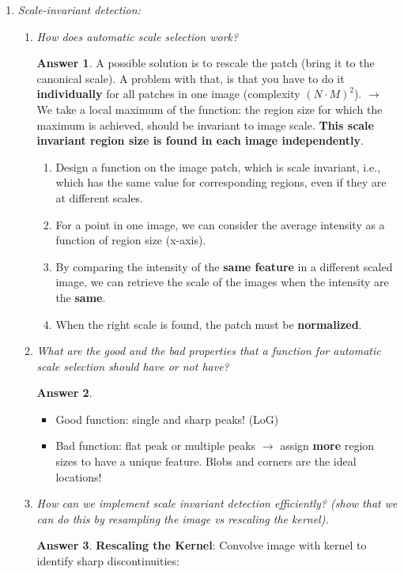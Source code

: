 \documentclass[a4paper,12 pt]{article}
\theoremstyle{definition}
\theoremstyle{remark}
\theoremstyle{definition}
\theoremstyle{definition}
\theoremstyle{definition}
\theoremstyle{definition}
\theoremstyle{remark}
\theoremstyle{remark}
\theoremstyle{definition}
\theoremstyle{definition}
\newtheorem*{answer}{Answer}
\begin{document}
\begin{enumerate}
\item \textit{Scale-invariant detection: }
\begin{enumerate}
\item \textit{How does automatic scale selection work? }
\begin{answer}
A possible solution is to rescale the patch (bring it to the canonical scale). A problem with that, is that you have to do it \textbf{individually} for all patches in one image (complexity $(N\cdot M)^2$). $\rightarrow$ We take a local maximum of the function: the region size for which the maximum is achieved, should be invariant to image scale. \textbf{This scale invariant region size is found in each image independently}.
\begin{enumerate}
\item Design a function on the image patch, which is scale invariant, i.e., which has the same value for corresponding regions, even if they are at different scales.
\item For a point in one image, we can consider the average intensity as a function of region size (x-axis). 
\item By comparing the intensity of the \textbf{same feature} in a different scaled image, we can retrieve the scale of the images when the intensity are the \textbf{same}. 
\item  When the right scale is found, the patch must be \textbf{normalized}.
\end{enumerate}
\end{answer}
\item \textit{What are the good and the bad properties that a function for automatic scale selection should have or not have?}
\begin{answer}
\
\begin{itemize}
\item Good function: single and sharp peaks! (LoG)
\item Bad function: flat peak or multiple peaks $\rightarrow$ assign \textbf{more} region sizes to have a unique feature. Blobs and corners are the ideal locations!
\end{itemize}
\end{answer}
\item \textit{How can we implement scale invariant detection efficiently? (show that we can do this by resampling the image vs rescaling the kernel). }
\begin{answer}
\textbf{Rescaling the Kernel}: Convolve image with kernel to identify sharp discontinuities:
\begin{equation}

\end{equation}
\end{answer}
\end{enumerate}
\end{enumerate}
\end{document}
